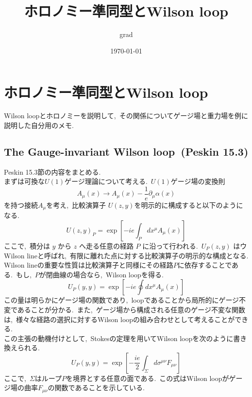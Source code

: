 \documentclass[uplatex,dvipdfmx]{jsarticle}
\begin{document}
\title{ホロノミー準同型とWilson loop}
\author{grad}
\date{\today}
\maketitle
\hypertarget{toc}{}\tableofcontents
\section{ホロノミー準同型とWilson loop}
Wilson loopとホロノミーを説明して,~その関係についてゲージ場と重力場を例に説明した自分用のメモ.
\subsection{The Gauge-invariant Wilson loop~(Peskin 15.3)}
Peskin 15.3節の内容をまとめる.\\
まずは可換な$U(1)$ゲージ理論について考える.~$U(1)$ゲージ場の変換則
\begin{equation}
    A_\mu(x) \to A_\mu(x) - \frac{1}{e}\partial_\mu \alpha(x)
\end{equation}
を持つ接続$A_\mu$を考え,~比較演算子 $U(z, y)$を明示的に構成すると以下のようになる.\\
\begin{equation}
    U(z, y)_P = \exp\left[-ie\int_P dx^\mu A_\mu(x)\right]
\end{equation}
ここで,~積分は $y$ から $z$ へ走る任意の経路 $P$ に沿って行われる.~$U_P(z,y)$ はウWilson lineと呼ばれ,~有限に離れた点に対する比較演算子の明示的な構成となる.\\
Wilson lineの重要な性質は比較演算子と同様にその経路$P$に依存することである.~もし,~$P$が閉曲線の場合なら,~Wilson loopを得る.
\begin{equation}
    U_P(y,y) = \exp \left[ -ie \oint dx^\mu A_\mu(x) \right]
\end{equation}
この量は明らかにゲージ場の関数であり,~loopであることから局所的にゲージ不変であることが分かる.~また,~ゲージ場から構成される任意のゲージ不変な関数は,~様々な経路の選択に対するWilson loopの組み合わせとして考えることができる.\\
この主張の動機付けとして,~Stokesの定理を用いてWilson loopを次のように書き換えられる.
\begin{equation}
    U_P(y,y) = \exp \left[ -\frac{ie}{2} \int_\Sigma d\sigma^{\mu\nu} F_{\mu\nu} \right]
\end{equation}
ここで,~$\Sigma$はループ$P$を境界とする任意の面である.~この式はWilson loopがゲージ場の曲率$F_{\mu\nu}$の関数であることを示している.\\
\end{document}
